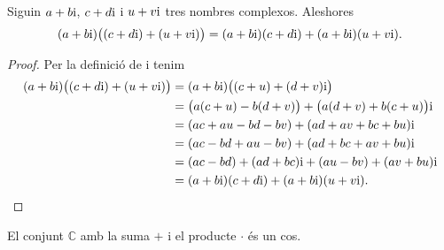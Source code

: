 \documentclass[../../Main.tex]{subfiles}
\begin{document}
	\begin{proposition}
		\label{prop:distribuitva del producte respecte la suma de nombres complexos}
		Siguin \(a+b\mathrm{i}\), \(c+d\mathrm{i}\) i \(u+v\mathrm{i}\) tres nombres complexos. Aleshores
		\[(a+b\mathrm{i})\big((c+d\mathrm{i})+(u+v\mathrm{i})\big)=(a+b\mathrm{i})(c+d\mathrm{i})+(a+b\mathrm{i})(u+v\mathrm{i}).\]
		\begin{proof}
			Per la definició de  i  tenim
			\begin{align*}
				(a+b\mathrm{i})\big((c+d\mathrm{i})+(u+v\mathrm{i})\big)&=(a+b\mathrm{i})\big((c+u)+(d+v)\mathrm{i}\big) \\
				&=\big(a(c+u)-b(d+v)\big)+\big(a(d+v)+b(c+u)\big)\mathrm{i} \\
				&=(ac+au-bd-bv)+(ad+av+bc+bu)\mathrm{i} \\
				&=(ac-bd+au-bv)+(ad+bc+av+bu)\mathrm{i}\\
				&=(ac-bd)+(ad+bc)\mathrm{i}+(au-bv)+(av+bu)\mathrm{i} \\
				&=(a+b\mathrm{i})(c+d\mathrm{i})+(a+b\mathrm{i})(u+v\mathrm{i}).\qedhere
			\end{align*}
		\end{proof}
	\end{proposition}
	\begin{corollary}
		\label{cor:els complexos formen un cos}
		El conjunt \(\mathbb{C}\) amb la suma \(+\) i el producte \(\cdot\) és un cos.
	\end{corollary}
	
	
\end{document}
